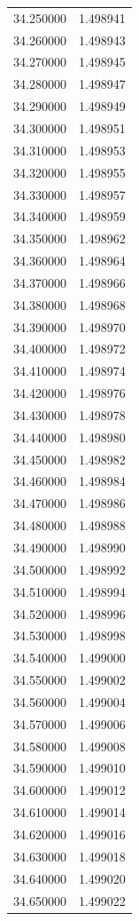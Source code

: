 \begin{tabular}{rr}
34.250000 & 1.498941 \\
34.260000 & 1.498943 \\
34.270000 & 1.498945 \\
34.280000 & 1.498947 \\
34.290000 & 1.498949 \\
34.300000 & 1.498951 \\
34.310000 & 1.498953 \\
34.320000 & 1.498955 \\
34.330000 & 1.498957 \\
34.340000 & 1.498959 \\
34.350000 & 1.498962 \\
34.360000 & 1.498964 \\
34.370000 & 1.498966 \\
34.380000 & 1.498968 \\
34.390000 & 1.498970 \\
34.400000 & 1.498972 \\
34.410000 & 1.498974 \\
34.420000 & 1.498976 \\
34.430000 & 1.498978 \\
34.440000 & 1.498980 \\
34.450000 & 1.498982 \\
34.460000 & 1.498984 \\
34.470000 & 1.498986 \\
34.480000 & 1.498988 \\
34.490000 & 1.498990 \\
34.500000 & 1.498992 \\
34.510000 & 1.498994 \\
34.520000 & 1.498996 \\
34.530000 & 1.498998 \\
34.540000 & 1.499000 \\
34.550000 & 1.499002 \\
34.560000 & 1.499004 \\
34.570000 & 1.499006 \\
34.580000 & 1.499008 \\
34.590000 & 1.499010 \\
34.600000 & 1.499012 \\
34.610000 & 1.499014 \\
34.620000 & 1.499016 \\
34.630000 & 1.499018 \\
34.640000 & 1.499020 \\
34.650000 & 1.499022 \\

\end{tabular}
